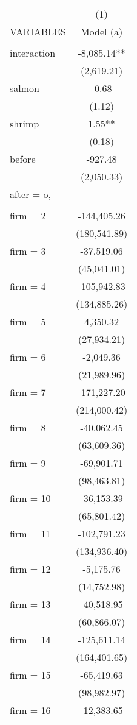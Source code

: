 \begin{tabular}{lc} \hline
 & (1) \\
VARIABLES & Model (a) \\ \hline
 &  \\
interaction & -8,085.14** \\
 & (2,619.21) \\
salmon & -0.68 \\
 & (1.12) \\
shrimp & 1.55** \\
 & (0.18) \\
before & -927.48 \\
 & (2,050.33) \\
after = o, & - \\
 &  \\
firm = 2 & -144,405.26 \\
 & (180,541.89) \\
firm = 3 & -37,519.06 \\
 & (45,041.01) \\
firm = 4 & -105,942.83 \\
 & (134,885.26) \\
firm = 5 & 4,350.32 \\
 & (27,934.21) \\
firm = 6 & -2,049.36 \\
 & (21,989.96) \\
firm = 7 & -171,227.20 \\
 & (214,000.42) \\
firm = 8 & -40,062.45 \\
 & (63,609.36) \\
firm = 9 & -69,901.71 \\
 & (98,463.81) \\
firm = 10 & -36,153.39 \\
 & (65,801.42) \\
firm = 11 & -102,791.23 \\
 & (134,936.40) \\
firm = 12 & -5,175.76 \\
 & (14,752.98) \\
firm = 13 & -40,518.95 \\
 & (60,866.07) \\
firm = 14 & -125,611.14 \\
 & (164,401.65) \\
firm = 15 & -65,419.63 \\
 & (98,982.97) \\
firm = 16 & -12,383.65 \\

\end{tabular}
